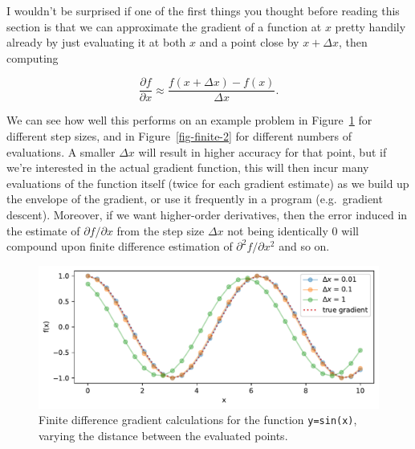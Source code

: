 \documentclass[
  11pt,
  numbers=noendperiod]{book}
\begin{document}
I wouldn't be surprised if one of the first things you thought before
reading this section is that we can approximate the gradient of a
function at \(x\) pretty handily already by just evaluating it at both
\(x\) and a point close by \(x + \Delta x\), then computing

\[ \frac{\partial f}{\partial x} \approx \frac{f(x+\Delta x) - f(x)}{\Delta x}.\]

We can see how well this performs on an example problem in
Figure~\ref{fig-finite-1} for different step sizes, and in
Figure~\ref{fig-finite-2} for different numbers of evaluations. A
smaller \(\Delta x\) will result in higher accuracy for that point, but
if we're interested in the actual gradient function, this will then
incur many evaluations of the function itself (twice for each gradient
estimate) as we build up the envelope of the gradient, or use it
frequently in a program (e.g.~gradient descent). Moreover, if we want
higher-order derivatives, then the error induced in the estimate of
\(\partial f / \partial x\) from the step size \(\Delta x\) not being
identically 0 will compound upon finite difference estimation of
\(\partial^2 f/ \partial x^2\) and so on.

\begin{figure}

{\centering \includegraphics{./autodiff_files/figure-pdf/fig-finite-1-output-1.pdf}

}

\caption{\label{fig-finite-1}Finite difference gradient calculations for
the function \texttt{y=sin(x)}, varying the distance between the
evaluated points.}

\end{figure}
\end{document}
